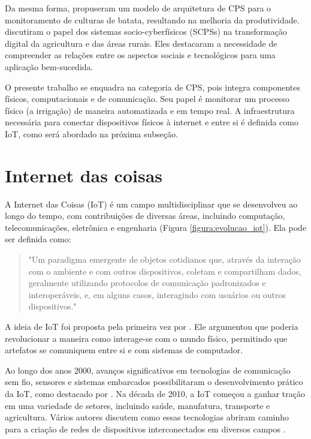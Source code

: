 Da mesma forma, \textcite{rad2015smart} propuseram um modelo de arquitetura de CPS para o monitoramento de culturas de batata, resultando na melhoria da produtividade. \textcite{rijswijk2021digital} discutiram o papel dos sistemas socio-cyberfísicos (SCPSs) na transformação digital da agricultura e das áreas rurais. Eles destacaram a necessidade de compreender as relações entre os aspectos sociais e tecnológicos para uma aplicação bem-sucedida.

O presente trabalho se enquadra na categoria de CPS, pois integra componentes físicos, computacionais e de comunicação. Seu papel é monitorar um processo físico (a irrigação) de maneira automatizada e em tempo real. A infraestrutura necessária para conectar dispositivos físicos à internet e entre si é definida como IoT, como será abordado na próxima subseção. 

\section{Internet das coisas}
A Internet das Coisas (IoT) é um campo multidisciplinar que se desenvolveu ao longo do tempo, com contribuições de diversas áreas, incluindo computação, telecomunicações, eletrônica e engenharia (Figura \ref{figura:evolucao_iot}). Ela pode ser definida como:

\begin{quote}
"Um paradigma emergente de objetos cotidianos que, através da interação com o ambiente e com outros dispositivos, coletam e compartilham dados, geralmente utilizando protocolos de comunicação padronizados e interoperáveis, e, em alguns casos, interagindo com usuários ou outros dispositivos." \parencite{kortuem2009things}
\end{quote}


A ideia de IoT foi proposta pela primeira vez por  \textcite{ashton1999things}. Ele argumentou que poderia revolucionar a maneira como interage-se com o mundo físico, permitindo que artefatos se comuniquem entre si e com sistemas de computador.

Ao longo dos anos 2000, avanços significativos em tecnologias de comunicação sem fio, sensores e sistemas embarcados possibilitaram o desenvolvimento prático da IoT, como destacado por \textcite{kortuem2009things}. Na década de 2010, a IoT começou a ganhar tração em uma variedade de setores, incluindo saúde, manufatura, transporte e agricultura. Vários autores discutem como essas tecnologias abriram caminho para a criação de redes de dispositivos interconectados em diversos campos \parencite{kortuem2009things, tan2010things, minerva2015towards}.

